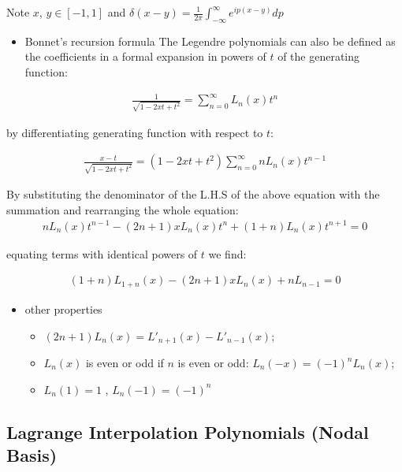 \documentclass[
]{scrartcl}
\providecommand{\tightlist}{%
  \setlength{\itemsep}{0pt}\setlength{\parskip}{0pt}}
\begin{document}
Note \(x\), \(y\in [-1,1]\) and
\(\delta(x-y) = \frac{1}{2\pi}\int_{-\infty}^{\infty}e^{ip(x-y)}dp\)

\begin{itemize}
\tightlist
\item
  Bonnet's recursion formula The Legendre polynomials can also be
  defined as the coefficients in a formal expansion in powers of \(t\)
  of the generating function:
\end{itemize}

\begin{align}
\frac{1}{\sqrt{1-2xt+t^2}} = \sum_{n=0}^{\infty}L_n(x)t^n
\end{align}

by differentiating generating function with respect to \(t\):

\begin{align}
\frac{x-t}{\sqrt{1-2xt+t^2}} = (1-2xt+t^2)\sum_{n=0}^{\infty}nL_n(x)t^{n-1}
\end{align}

By substituting the denominator of the L.H.S of the above equation with
the summation and rearranging the whole equation: \begin{align}
nL_n(x)t^{n-1} - (2n+1)xL_n(x)t^n + (1+n)L_n(x)t^{n+1} = 0
\end{align}

equating terms with identical powers of \(t\) we find:

\begin{align}
(1+n)L_{1+n}(x) - (2n+1)xL_n(x) + nL_{n-1} = 0
\end{align}

\begin{itemize}
\tightlist
\item
  other properties

  \begin{itemize}
  \tightlist
  \item
    \((2n+1)L_n(𝑥)=L'_{n+1}(x)−L'_{n−1}(x)\);
  \item
    \(L_n(x)\) is even or odd if \(n\) is even or odd:
    \(L_{n}(-x)=(-1)^{n}L_{n}(x)\);
  \item
    \(L_n(1)=1\) , \(L_n(−1)=(−1)^n\)
  \end{itemize}
\end{itemize}

\hypertarget{lagrange-interpolation-polynomials-nodal-basis}{%
\subsection{Lagrange Interpolation Polynomials (Nodal
Basis)}\label{lagrange-interpolation-polynomials-nodal-basis}}
\end{document}
